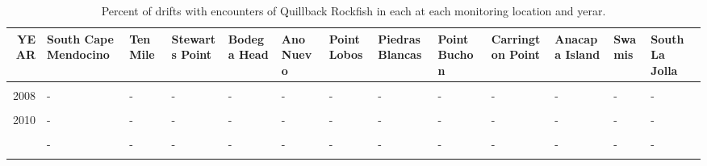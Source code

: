 \documentclass[
]{article}
\begin{document}
\begin{landscape}\begin{table}

\caption{\label{tab:percentpos}Percent of drifts with encounters of Quillback Rockfish in each at each monitoring location and yerar.}
\centering
\begin{tabular}[t]{r>{\raggedright\arraybackslash}p{1.7cm}>{\raggedright\arraybackslash}p{1.2cm}>{\raggedright\arraybackslash}p{1.2cm}>{\raggedright\arraybackslash}p{1.2cm}>{\raggedright\arraybackslash}p{1.2cm}>{\raggedright\arraybackslash}p{1.2cm}>{\raggedright\arraybackslash}p{1.2cm}>{\raggedright\arraybackslash}p{1.2cm}>{\raggedright\arraybackslash}p{1.7cm}>{\raggedright\arraybackslash}p{1.2cm}>{\raggedright\arraybackslash}p{1.2cm}l}
\toprule
YEAR & South Cape Mendocino & Ten Mile & Stewarts Point & Bodega Head & Ano Nuevo & Point Lobos & Piedras Blancas & Point Buchon & Carrington Point & Anacapa Island & Swamis & South La Jolla\\
\midrule
\cellcolor{gray!6}{2007} & \cellcolor{gray!6}{-} & \cellcolor{gray!6}{-} & \cellcolor{gray!6}{-} & \cellcolor{gray!6}{-} & \cellcolor{gray!6}{-} & \cellcolor{gray!6}{-} & \cellcolor{gray!6}{-} & \cellcolor{gray!6}{-} & \cellcolor{gray!6}{-} & \cellcolor{gray!6}{-} & \cellcolor{gray!6}{-} & \cellcolor{gray!6}{-}\\
2008 & - & - & - & - & - & - & - & - & - & - & - & -\\
\cellcolor{gray!6}{2009} & \cellcolor{gray!6}{-} & \cellcolor{gray!6}{-} & \cellcolor{gray!6}{-} & \cellcolor{gray!6}{-} & \cellcolor{gray!6}{-} & \cellcolor{gray!6}{-} & \cellcolor{gray!6}{-} & \cellcolor{gray!6}{-} & \cellcolor{gray!6}{-} & \cellcolor{gray!6}{-} & \cellcolor{gray!6}{-} & \cellcolor{gray!6}{-}\\
2010 & - & - & - & - & - & - & - & - & - & - & - & -\\
\cellcolor{gray!6}{2011} & \cellcolor{gray!6}{-} & \cellcolor{gray!6}{-} & \cellcolor{gray!6}{-} & \cellcolor{gray!6}{-} & \cellcolor{gray!6}{-} & \cellcolor{gray!6}{-} & \cellcolor{gray!6}{-} & \cellcolor{gray!6}{-} & \cellcolor{gray!6}{-} & \cellcolor{gray!6}{-} & \cellcolor{gray!6}{-} & \cellcolor{gray!6}{-}\\
\addlinespace
2012 & - & - & - & - & - & - & - & - & - & - & - & -\\
\cellcolor{gray!6}{2013} & \cellcolor{gray!6}{-} & \cellcolor{gray!6}{-} & \cellcolor{gray!6}{-} & \cellcolor{gray!6}{-} & \cellcolor{gray!6}{-} & \cellcolor{gray!6}{-} & \cellcolor{gray!6}{-} & \cellcolor{gray!6}{-} & \cellcolor{gray!6}{-} & \cellcolor{gray!6}{-} & \cellcolor{gray!6}{-} & \cellcolor{gray!6}{-}\\

\end{tabular}
\end{table}
\end{landscape}
\end{document}
